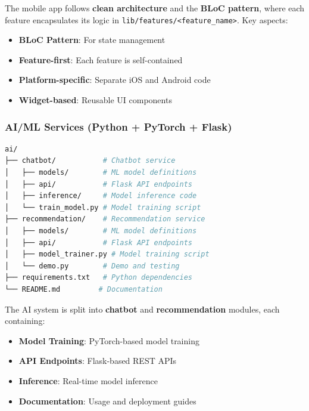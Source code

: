 \begin{tcolorbox}[title=Mobile Architecture]
The mobile app follows \textbf{clean architecture} and the \textbf{BLoC pattern}, where each feature encapsulates its logic in \texttt{lib/features/<feature\_name>}. Key aspects:
\begin{itemize}
    \item \textbf{BLoC Pattern}: For state management
    \item \textbf{Feature-first}: Each feature is self-contained
    \item \textbf{Platform-specific}: Separate iOS and Android code
    \item \textbf{Widget-based}: Reusable UI components
\end{itemize}
\end{tcolorbox}

\subsubsection{AI/ML Services (Python + PyTorch + Flask)}

\begin{lstlisting}[language=bash, caption={AI/ML Services Directory Structure (tree -L 2)}]
ai/
├── chatbot/           # Chatbot service
│   ├── models/        # ML model definitions
│   ├── api/           # Flask API endpoints
│   ├── inference/     # Model inference code
│   └── train_model.py # Model training script
├── recommendation/    # Recommendation service
│   ├── models/        # ML model definitions
│   ├── api/           # Flask API endpoints
│   ├── model_trainer.py # Model training script
│   └── demo.py        # Demo and testing
├── requirements.txt   # Python dependencies
└── README.md         # Documentation
\end{lstlisting}

\begin{tcolorbox}[title=AI/ML Architecture]
The AI system is split into \textbf{chatbot} and \textbf{recommendation} modules, each containing:
\begin{itemize}
    \item \textbf{Model Training}: PyTorch-based model training
    \item \textbf{API Endpoints}: Flask-based REST APIs
    \item \textbf{Inference}: Real-time model inference
    \item \textbf{Documentation}: Usage and deployment guides
\end{itemize}
\end{tcolorbox}

